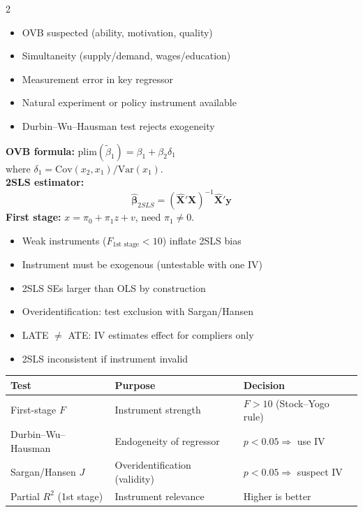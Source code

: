 \documentclass[10pt,a4paper]{article}
\begin{document}
\begin{multicols}{2}

\begin{tcolorbox}[when]
\begin{itemize}
  \item OVB suspected (ability, motivation, quality)
  \item Simultaneity (supply/demand, wages/education)
  \item Measurement error in key regressor
  \item Natural experiment or policy instrument available
  \item Durbin--Wu--Hausman test rejects exogeneity
\end{itemize}
\end{tcolorbox}

\begin{tcolorbox}[key]
\textbf{OVB formula:} $\text{plim}(\tilde\beta_1) = \beta_1 + \beta_2 \delta_1$\\
where $\delta_1 = \text{Cov}(x_2, x_1)/\text{Var}(x_1)$.\\[4pt]
\textbf{2SLS estimator:}
\[
\hat{\boldsymbol\beta}_{2SLS} = (\hat{\mathbf{X}}'\mathbf{X})^{-1}\hat{\mathbf{X}}'\mathbf{y}
\]
\textbf{First stage:} $x = \pi_0 + \pi_1 z + v$, need $\pi_1 \neq 0$.
\end{tcolorbox}

\columnbreak

\begin{tcolorbox}[watchout]
\begin{itemize}
  \item Weak instruments ($F_{\text{1st stage}} < 10$) inflate 2SLS bias
  \item Instrument must be exogenous (untestable with one IV)
  \item 2SLS SEs larger than OLS by construction
  \item Overidentification: test exclusion with Sargan/Hansen
  \item LATE $\neq$ ATE: IV estimates effect for compliers only
  \item 2SLS inconsistent if instrument invalid
\end{itemize}
\end{tcolorbox}

\end{multicols}

\begin{tcolorbox}[tests]
\begin{tabularx}{\linewidth}{lXl}
\toprule
\textbf{Test} & \textbf{Purpose} & \textbf{Decision} \\
\midrule
First-stage $F$ & Instrument strength & $F > 10$ (Stock--Yogo rule) \\
\rowcolor{RowGray}
Durbin--Wu--Hausman & Endogeneity of regressor & $p < 0.05 \Rightarrow$ use IV \\
Sargan/Hansen $J$ & Overidentification (validity) & $p < 0.05 \Rightarrow$ suspect IV \\
\rowcolor{RowGray}
Partial $R^2$ (1st stage) & Instrument relevance & Higher is better \\
\bottomrule
\end{tabularx}
\end{tcolorbox}
\end{document}
